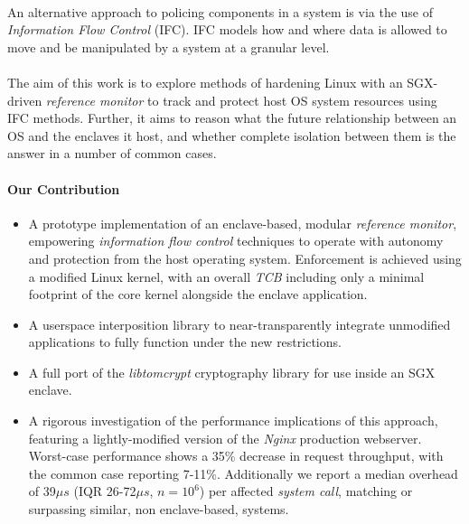 \paragraph{} An alternative approach to policing components in a system is via the use of \textit{Information Flow Control} (IFC). IFC models how and where data is allowed to move and be manipulated by a system at a granular level.

\paragraph{} The aim of this work is to explore methods of hardening Linux with an SGX-driven \textit{reference monitor} to track and protect host OS system resources using IFC methods. Further, it aims to reason what the future relationship between an OS and the enclaves it host, and whether complete isolation between them is the answer in a number of common cases.


\paragraph{Our Contribution}
\begin{itemize}
    \item A prototype implementation of an enclave-based, modular \textit{reference monitor}, empowering \textit{information flow control} techniques to operate with autonomy and protection from the host operating system. Enforcement is achieved using a modified Linux kernel, with an overall \textit{TCB} including only a minimal footprint of the core kernel alongside the enclave application.
    \item A userspace interposition library to near-transparently integrate unmodified applications to fully function under the new restrictions.
    \item A full port of the \textit{libtomcrypt} cryptography library for use inside an SGX enclave.
    \item A rigorous investigation of the performance implications of this approach, featuring a lightly-modified version of the \textit{Nginx} production webserver. Worst-case performance shows a 35\% decrease in request throughput, with the common case reporting 7-11\%. Additionally we report a median overhead of 39$\mu s$ (IQR 26-72$\mu s$, $n = 10^6$) per affected \textit{system call}, matching or surpassing similar, non enclave-based, systems.
\end{itemize}